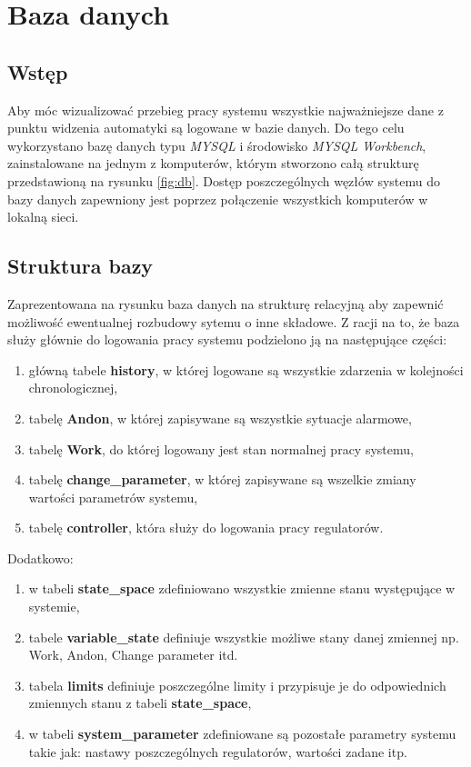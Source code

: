 \chapter{Baza danych}

\section{Wstęp}
Aby móc wizualizować przebieg pracy systemu wszystkie najważniejsze dane z punktu widzenia automatyki są logowane w bazie danych. Do tego celu wykorzystano bazę danych typu \textit{MYSQL} i środowisko \textit{MYSQL Workbench}, zainstalowane na jednym z komputerów, którym stworzono całą strukturę przedstawioną na rysunku \ref{fig:db}. Dostęp poszczególnych węzłów systemu do bazy danych zapewniony jest poprzez połączenie wszystkich komputerów w lokalną sieci. 
 

\section{Struktura bazy}

Zaprezentowana na rysunku baza danych na strukturę relacyjną aby zapewnić możliwość ewentualnej rozbudowy sytemu o inne składowe. Z racji na to, że baza służy głównie do logowania pracy systemu podzielono ją na następujące części:
\begin{enumerate}
	\item główną tabele \textbf{history}, w której logowane są wszystkie zdarzenia w kolejności chronologicznej,
	\item tabelę  \textbf{Andon}, w której zapisywane są wszystkie sytuacje alarmowe,
	\item tabelę \textbf{Work}, do której logowany jest stan normalnej pracy systemu,
	\item tabelę \textbf{change\_parameter}, w której zapisywane są wszelkie zmiany wartości parametrów systemu,
	\item tabelę \textbf{controller}, która służy do logowania pracy regulatorów.
\end{enumerate}
%
Dodatkowo:
\begin{enumerate}
	\item w tabeli \textbf{state\_space} zdefiniowano wszystkie zmienne stanu występujące w systemie,
	\item tabele \textbf{variable\_state} definiuje wszystkie możliwe stany danej zmiennej np. Work, Andon, Change parameter itd.
	\item tabela \textbf{limits} definiuje poszczególne limity i przypisuje je do odpowiednich zmiennych stanu z tabeli \textbf{state\_space},
	\item w tabeli \textbf{system\_parameter} zdefiniowane są pozostałe parametry systemu takie jak: nastawy poszczególnych regulatorów, wartości zadane itp.
\end{enumerate}

